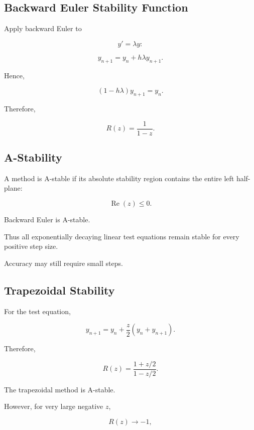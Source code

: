 \subsection{Backward Euler Stability Function}
\label{subsec:backward-euler-stability}

Apply backward Euler to

\[
y'=\lambda y:
\]

\[
y_{n+1}
=
y_n+h\lambda y_{n+1}.
\]

Hence,

\[
(1-h\lambda)y_{n+1}
=
y_n.
\]

Therefore,

\[
\boxed{
R(z)
=
\frac1{1-z}.
}
\]

\subsection{A-Stability}
\label{subsec:a-stability}

A method is A-stable if its absolute stability region contains the entire
left half-plane:

\[
\boxed{
\operatorname{Re}(z)\leq0.
}
\]

Backward Euler is A-stable.

Thus all exponentially decaying linear test equations remain stable for
every positive step size.

Accuracy may still require small steps.

\subsection{Trapezoidal Stability}
\label{subsec:trapezoidal-stability}

For the test equation,

\[
y_{n+1}
=
y_n
+
\frac{z}{2}
(
y_n+y_{n+1}
).
\]

Therefore,

\[
\boxed{
R(z)
=
\frac{
1+z/2
}{
1-z/2
}.
}
\]

The trapezoidal method is A-stable.

However, for very large negative \(z\),

\[
R(z)\to-1,
\]

